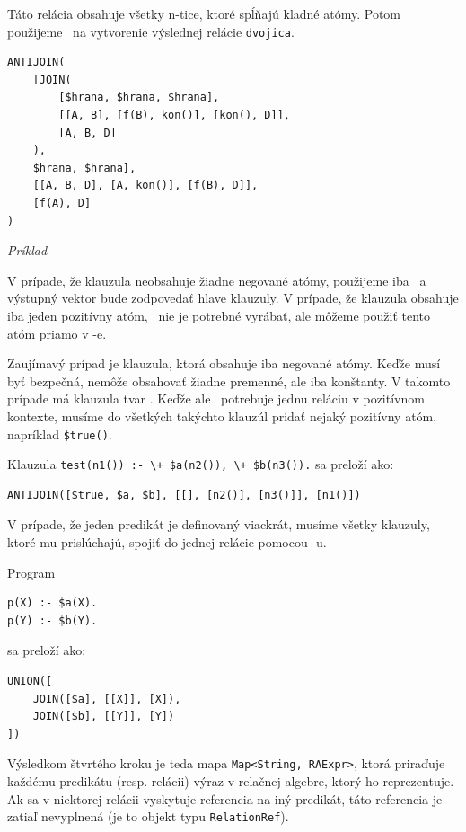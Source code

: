 Táto relácia obsahuje všetky n-tice, ktoré spĺňajú kladné atómy. Potom použijeme \ANTIJOIN\ na
vytvorenie výslednej relácie \verb|dvojica|.

\begin{verbatim}
ANTIJOIN(
    [JOIN(
        [$hrana, $hrana, $hrana],
        [[A, B], [f(B), kon()], [kon(), D]],
        [A, B, D]
    ),
    $hrana, $hrana],
    [[A, B, D], [A, kon()], [f(B), D]],
    [f(A), D]
)
\end{verbatim}
\begin{center}
\centering
\textit{Príklad \thepriklad}
\end{center}
\medskip

V prípade, že klauzula neobsahuje žiadne negované atómy, použijeme iba \JOIN\ a výstupný vektor bude
zodpovedať hlave klauzuly. V prípade, že klauzula obsahuje iba jeden pozitívny atóm, \JOIN\ nie je
potrebné vyrábať, ale môžeme použiť tento atóm priamo v \ANTIJOIN-e.

Zaujímavý prípad je klauzula, ktorá obsahuje iba negované atómy. Keďže musí byť bezpečná, nemôže
obsahovať žiadne premenné, ale iba konštanty. V takomto prípade má klauzula tvar . Keďže
ale \ANTIJOIN\ potrebuje jednu reláciu v pozitívnom kontexte, musíme do všetkých takýchto klauzúl
pridať nejaký pozitívny atóm, napríklad \verb|$true()|.

\begin{priklad}
    Klauzula \verb|test(n1()) :- \+ $a(n2()), \+ $b(n3()).| sa preloží ako:
\begin{verbatim}
ANTIJOIN([$true, $a, $b], [[], [n2()], [n3()]], [n1()])
\end{verbatim}
\end{priklad}

V prípade, že jeden predikát je definovaný viackrát, musíme všetky klauzuly, ktoré mu prislúchajú,
spojiť do jednej relácie pomocou \UNION-u.

\begin{priklad}
    Program
\begin{verbatim}
p(X) :- $a(X).
p(Y) :- $b(Y).
\end{verbatim}
sa preloží ako:
\begin{verbatim}
UNION([
    JOIN([$a], [[X]], [X]),
    JOIN([$b], [[Y]], [Y])
])
\end{verbatim}
\end{priklad}

Výsledkom štvrtého kroku je teda mapa \texttt{Map<String, RAExpr>}, ktorá priraďuje každému
predikátu (resp. relácii) výraz v relačnej algebre, ktorý ho reprezentuje. Ak sa v niektorej relácii
vyskytuje referencia na iný predikát, táto referencia je zatiaľ nevyplnená (je to objekt typu
\texttt{RelationRef}).

